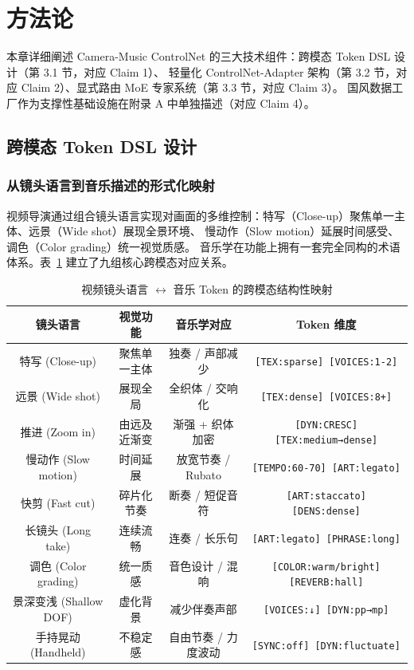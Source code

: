 \documentclass[UTF8,12pt,a4paper]{ctexart}
\begin{document}
\section{方法论}

本章详细阐述 Camera-Music ControlNet 的三大技术组件：跨模态 Token DSL 设计（第 3.1 节，对应 Claim 1）、
轻量化 ControlNet-Adapter 架构（第 3.2 节，对应 Claim 2）、显式路由 MoE 专家系统（第 3.3 节，对应 Claim 3）。
国风数据工厂作为支撑性基础设施在附录 A 中单独描述（对应 Claim 4）。

\subsection{跨模态 Token DSL 设计}

\subsubsection{从镜头语言到音乐描述的形式化映射}

视频导演通过组合镜头语言实现对画面的多维控制：特写（Close-up）聚焦单一主体、远景（Wide shot）展现全景环境、
慢动作（Slow motion）延展时间感受、调色（Color grading）统一视觉质感。
音乐学在功能上拥有一套完全同构的术语体系。表~\ref{tab:mapping} 建立了九组核心跨模态对应关系。

\begin{table}[H]
\centering
\caption{视频镜头语言 $\leftrightarrow$ 音乐 Token 的跨模态结构性映射}
\label{tab:mapping}
\begin{tabular}{c|c|c|c}
\toprule
\textbf{镜头语言} & \textbf{视觉功能} & \textbf{音乐学对应} & \textbf{Token 维度} \\
\midrule
特写 (Close-up) & 聚焦单一主体 & 独奏 / 声部减少 & \texttt{[TEX:sparse] [VOICES:1-2]} \\
远景 (Wide shot) & 展现全局 & 全织体 / 交响化 & \texttt{[TEX:dense] [VOICES:8+]} \\
推进 (Zoom in) & 由远及近渐变 & 渐强 + 织体加密 & \texttt{[DYN:CRESC] [TEX:medium→dense]} \\
慢动作 (Slow motion) & 时间延展 & 放宽节奏 / Rubato & \texttt{[TEMPO:60-70] [ART:legato]} \\
快剪 (Fast cut) & 碎片化节奏 & 断奏 / 短促音符 & \texttt{[ART:staccato] [DENS:dense]} \\
长镜头 (Long take) & 连续流畅 & 连奏 / 长乐句 & \texttt{[ART:legato] [PHRASE:long]} \\
调色 (Color grading) & 统一质感 & 音色设计 / 混响 & \texttt{[COLOR:warm/bright] [REVERB:hall]} \\
景深变浅 (Shallow DOF) & 虚化背景 & 减少伴奏声部 & \texttt{[VOICES:↓] [DYN:pp→mp]} \\
手持晃动 (Handheld) & 不稳定感 & 自由节奏 / 力度波动 & \texttt{[SYNC:off] [DYN:fluctuate]} \\
\bottomrule
\end{tabular}
\end{table}
\end{document}
